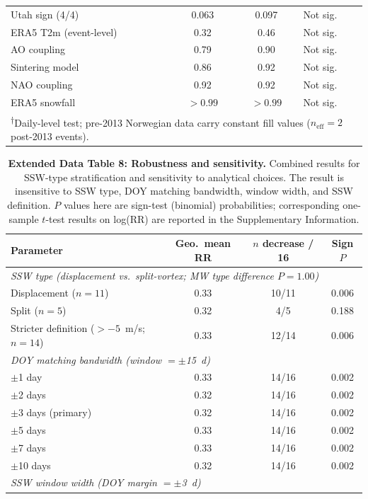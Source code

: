 \documentclass[11pt,letterpaper]{article}
\begin{document}
\begin{table}[!ht]
\begin{tabular}{lccl}
Utah sign (4/4) & 0.063 & 0.097 & Not sig. \\
ERA5 T2m (event-level) & 0.32 & 0.46 & Not sig. \\
AO coupling & 0.79 & 0.90 & Not sig. \\
Sintering model & 0.86 & 0.92 & Not sig. \\
NAO coupling & 0.92 & 0.92 & Not sig. \\
ERA5 snowfall & $> 0.99$ & $> 0.99$ & Not sig. \\
\bottomrule
\multicolumn{4}{l}{\textsuperscript{$\dagger$}\scriptsize Daily-level test; pre-2013 Norwegian data carry constant fill values ($n_{\mathrm{eff}} = 2$ post-2013 events).}
\end{tabular}
\end{table}

\begin{table}[!ht]
\centering
\caption{\textbf{Extended Data Table 8: Robustness and sensitivity.}
Combined results for SSW-type stratification and sensitivity to analytical choices. The result is insensitive to SSW type, DOY matching bandwidth, window width, and SSW definition. $P$ values here are sign-test (binomial) probabilities; corresponding one-sample $t$-test results on log(RR) are reported in the Supplementary Information.}
\label{tab:sensitivity}
\small
\begin{tabular}{lccc}
\toprule
Parameter & Geo.\ mean RR & $n$ decrease / 16 & Sign $P$ \\
\midrule
\multicolumn{4}{l}{\textit{SSW type (displacement vs.\ split-vortex; MW type difference $P = 1.00$)}} \\
Displacement ($n = 11$) & 0.33 & 10/11 & 0.006 \\
Split ($n = 5$) & 0.32 & 4/5 & 0.188 \\
Stricter definition ($> -5$~m/s; $n = 14$) & 0.33 & 12/14 & 0.006 \\
\midrule
\multicolumn{4}{l}{\textit{DOY matching bandwidth (window $= \pm$15~d)}} \\
$\pm$1 day & 0.33 & 14/16 & 0.002 \\
$\pm$2 days & 0.32 & 14/16 & 0.002 \\
$\pm$3 days (primary) & 0.32 & 14/16 & 0.002 \\
$\pm$5 days & 0.33 & 14/16 & 0.002 \\
$\pm$7 days & 0.33 & 14/16 & 0.002 \\
$\pm$10 days & 0.32 & 14/16 & 0.002 \\
\midrule
\multicolumn{4}{l}{\textit{SSW window width (DOY margin $= \pm$3~d)}} \\

\end{tabular}
\end{table}
\end{document}
